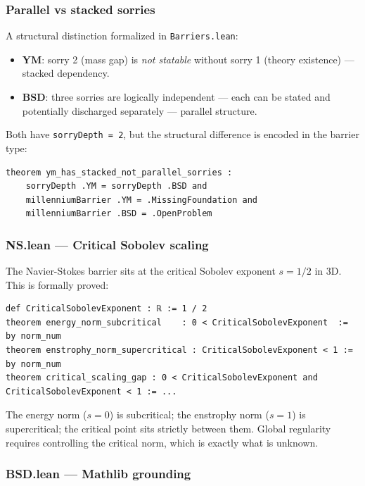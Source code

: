 \documentclass[10pt,a4paper]{article}
\begin{document}
\subsubsection{Parallel vs stacked sorries}

A structural distinction formalized in \texttt{Barriers.lean}:

\begin{itemize}
    \item \textbf{YM}: sorry 2 (mass gap) is \emph{not statable} without sorry 1 (theory existence) --- stacked dependency.
    \item \textbf{BSD}: three sorries are logically independent --- each can be stated and potentially discharged separately --- parallel structure.
\end{itemize}

Both have \texttt{sorryDepth = 2}, but the structural difference is encoded in the barrier type:

\begin{lstlisting}[language=lean]
theorem ym_has_stacked_not_parallel_sorries :
    sorryDepth .YM = sorryDepth .BSD and
    millenniumBarrier .YM = .MissingFoundation and
    millenniumBarrier .BSD = .OpenProblem
\end{lstlisting}

\subsubsection{NS.lean --- Critical Sobolev scaling}

The Navier-Stokes barrier sits at the critical Sobolev exponent $s = 1/2$ in 3D. This is formally proved:

\begin{lstlisting}[language=lean]
def CriticalSobolevExponent : ℝ := 1 / 2
theorem energy_norm_subcritical    : 0 < CriticalSobolevExponent  := by norm_num
theorem enstrophy_norm_supercritical : CriticalSobolevExponent < 1 := by norm_num
theorem critical_scaling_gap : 0 < CriticalSobolevExponent and CriticalSobolevExponent < 1 := ...
\end{lstlisting}

The energy norm ($s=0$) is subcritical; the enstrophy norm ($s=1$) is supercritical; the critical point sits strictly between them. Global regularity requires controlling the critical norm, which is exactly what is unknown.

\subsubsection{BSD.lean --- Mathlib grounding}
\end{document}
